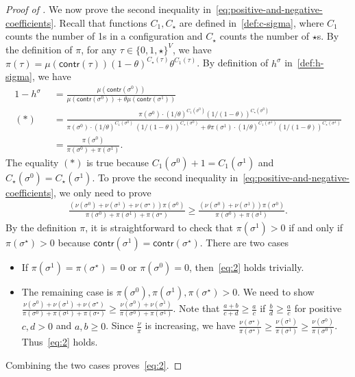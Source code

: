 \documentclass[11pt,a4paper]{article}
\theoremstyle{definition}
\begin{document}
\begin{proof}[Proof of ]
We now prove the second inequality in~\eqref{eq:positive-and-negative-coefficients}.
Recall that functions $C_1,C_\star$ are defined in~\eqref{def:c-sigma}, where $C_1$ counts the number of 1s in a configuration and $C_\star$ counts the number of $\star$s. 
By the definition of $\pi$, for any $\tau \in \{0,1,\star\}^V$, we have $\pi(\tau) = \mu(\textsf{contr}(\tau))(1-\theta)^{C_\star(\tau)}\theta^{C_1(\tau)}$.
By definition of $h^\sigma$ in~\eqref{def:h-sigma}, we have
\begin{align*}
1-h^\sigma &=\frac{\mu(\textsf{contr}(\sigma^0))}{\mu(\textsf{contr}(\sigma^0))+\theta \mu(\textsf{contr}(\sigma^1))}\\
(\ast)\quad &=\frac{\pi(\sigma^0)\cdot (1/\theta)^{C_1(\sigma^0)}(1/(1-\theta))^{C_\star(\sigma^0)}}{\pi(\sigma^0)\cdot (1/\theta)^{C_1(\sigma^0)}\ (1/(1-\theta))^{C_\star(\sigma^0)}+\theta\pi(\sigma^1)\cdot (1/\theta)^{C_1(\sigma^1)}(1/(1-\theta))^{C_\star(\sigma^1)}} \\
&=\frac{\pi(\sigma^0)}{\pi(\sigma^0)+\pi(\sigma^1)}.
\end{align*}
The equality $(\ast)$ is true because $C_1(\sigma^0) + 1 = C_1(\sigma^1)$ and $C_\star(\sigma^0) = C_\star(\sigma^1)$.
To prove the second inequality in~\eqref{eq:positive-and-negative-coefficients}, we only need to prove
\begin{align}\label{eq:2}
\frac{(\nu(\sigma^0)+\nu(\sigma^1)+\nu(\sigma^\star))\pi(\sigma^0)}{\pi(\sigma^0)+\pi(\sigma^1)+\pi(\sigma^\star)}\geq \frac{(\nu(\sigma^0)+\nu(\sigma^1))\pi(\sigma^0)}{\pi(\sigma^0)+\pi(\sigma^1)}.
\end{align}
By the definition $\pi$, it is straightforward to check that $\pi(\sigma^1) > 0$ if and only if $\pi(\sigma^\star) > 0$ because $\textsf{contr}(\sigma^1)=\textsf{contr}(\sigma^\star)$. There are two cases
\begin{itemize}
    \item If $\pi(\sigma^1)=\pi(\sigma^\star) = 0$ or $\pi(\sigma^0) = 0$, then~\eqref{eq:2} holds trivially.
    \item The remaining case is $\pi(\sigma^0), \pi(\sigma^1),\pi(\sigma^\star) > 0$. We need to show $\frac{\nu(\sigma^0)+\nu(\sigma^1)+\nu(\sigma^\star)}{\pi(\sigma^0)+\pi(\sigma^1)+\pi(\sigma^\star)}\geq \frac{\nu(\sigma^0)+\nu(\sigma^1)}{\pi(\sigma^0)+\pi(\sigma^1)}$. Note that $\frac{a+b}{c+d} \geq \frac{a}{c}$ if $\frac{b}{d} \geq \frac{a}{c}$ for positive $c,d > 0$ and $a,b \geq 0$. Since $\frac{\nu}{\pi}$ is increasing, we have $\frac{\nu(\sigma^\star)}{\pi(\sigma^\star)}\geq \frac{\nu(\sigma^1)}{\pi(\sigma^1)}\geq \frac{\nu(\sigma^0)}{\pi(\sigma^0)}$. Thus~\eqref{eq:2} holds.
\end{itemize}
Combining the two cases proves~\eqref{eq:2}.
\end{proof}
\end{document}
